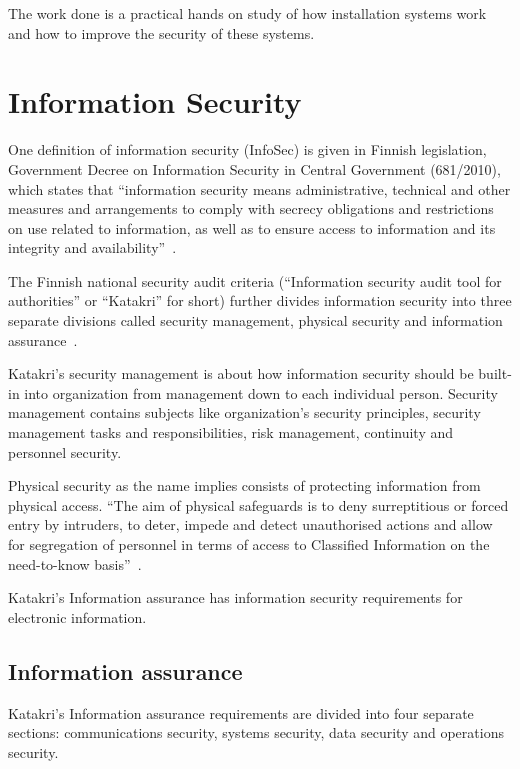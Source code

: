 The work done is a practical hands on study of how installation
systems work and how to improve the security of these systems.


\section{Information Security}

One definition of information security (InfoSec) is given in Finnish
legislation, Government Decree on Information Security in Central
Government (681/2010), which states that ``information security means
administrative, technical and other measures and arrangements to
comply with secrecy obligations and restrictions on use related to
information, as well as to ensure access to information and its
integrity and availability''~\cite{finlex-infosec-in-gov}.

The Finnish national security audit criteria (``Information security
audit tool for authorities'' or ``Katakri'' for short) further divides
information security into three separate divisions called security
management, physical security and information
assurance~\cite{katakri}.

Katakri's security management is about how information security should
be built-in into organization from management down to each individual
person. Security management contains subjects like organization's
security principles, security management tasks and responsibilities,
risk management, continuity and personnel security.

Physical security as the name implies consists of protecting
information from physical access. ``The aim of physical safeguards is
to deny surreptitious or forced entry by intruders, to deter, impede
and detect unauthorised actions and allow for segregation of personnel
in terms of access to Classified Information on the need-to-know
basis''~\cite{katakri}.

Katakri's Information assurance has information security requirements
for electronic information.


\subsection{Information assurance}

Katakri's Information assurance requirements are divided into four
separate sections: communications security, systems security, data
security and operations security.

